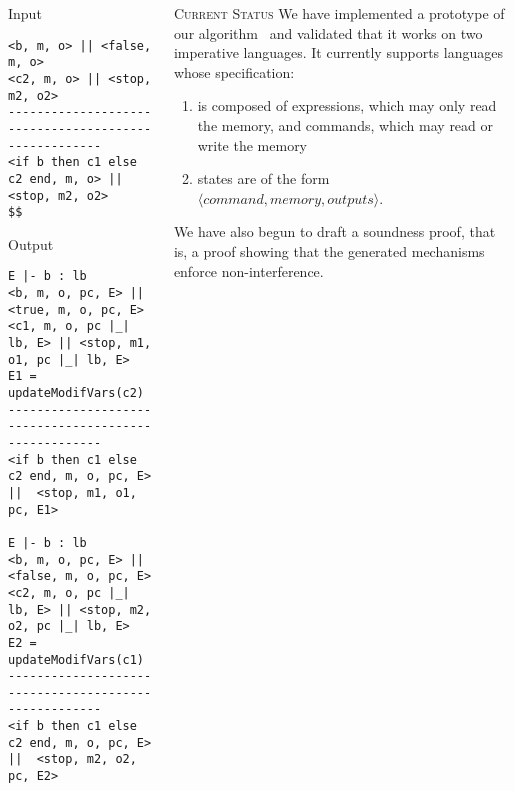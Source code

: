 \documentclass[final]{beamer}
\newlength{\onecolwid}
\newlength{\twocolwid}
\begin{document}
\begin{frame}[fragile]
\begin{columns}[t]
\begin{column}{\twocolwid}
\begin{minipage}[t]{0.49\linewidth}
\begin{alertblock}{Input}
\begin{lstlisting}
<b, m, o> || <false, m, o>
<c2, m, o> || <stop, m2, o2>
-----------------------------------------------------
<if b then c1 else c2 end, m, o> || <stop, m2, o2>
$$
\end{lstlisting}        
\end{alertblock}
\end{minipage}
\hfill%
\begin{minipage}[t]{0.49\linewidth}
\begin{alertblock}{Output}
\begin{lstlisting}
E |- b : lb
<b, m, o, pc, E> || <true, m, o, pc, E>
<c1, m, o, pc |_| lb, E> || <stop, m1, o1, pc |_| lb, E>
E1 = updateModifVars(c2)
-----------------------------------------------------
<if b then c1 else c2 end, m, o, pc, E> ||  <stop, m1, o1, pc, E1>

E |- b : lb
<b, m, o, pc, E> || <false, m, o, pc, E>
<c2, m, o, pc |_| lb, E> || <stop, m2, o2, pc |_| lb, E>
E2 = updateModifVars(c1)
-----------------------------------------------------
<if b then c1 else c2 end, m, o, pc, E> ||  <stop, m2, o2, pc, E2>
\end{lstlisting}
\end{alertblock}
\end{minipage}
\end{column}

\begin{column}{\onecolwid}

\begin{block}{\textsc{Current Status}}
We have implemented a prototype of our algorithm~\cite{GitHub:ott-ifc} and validated that it works on two imperative languages. It currently supports languages whose specification: 
\begin{enumerate}
\item is composed of expressions, which may only read the memory, and commands, which may read or write the memory
\item states are of the form $\langle command, memory, outputs\rangle$. 
\end{enumerate}

We have also begun to draft a soundness proof, that is, a proof showing that the generated mechanisms enforce non-interference.


\end{block}


\end{column}
\end{columns}
\end{frame}
\end{document}
